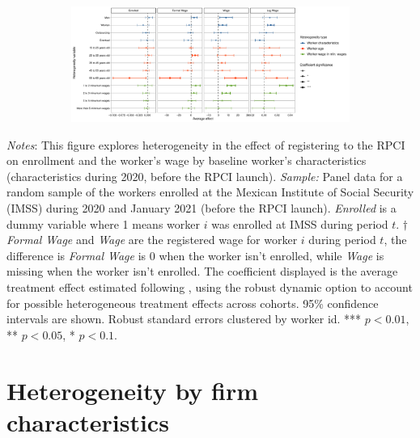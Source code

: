 \documentclass[10pt, oneside]{book}
\begin{document}
\begin{figure}[H]
    \centering
    \caption{Heterogeneity by worker characteristics \label{fig:heterogeneity_worker_rpci}}
    
    \begin{subfigure}{\textwidth}
    \includegraphics[width=\textwidth]{04_Figures/muestra_10porciento/dcdh_heterogeneity_worker_characteristics.pdf}
    \end{subfigure}
    
\end{figure}

\scriptsize{
\noindent \textit{Notes}: This figure explores heterogeneity in the effect of registering to the RPCI on enrollment and the worker's wage by baseline worker's characteristics (characteristics during 2020, before the RPCI launch). \textit{Sample:} Panel data for a random sample of the workers enrolled at the Mexican Institute of Social Security (IMSS) during 2020 and January 2021 (before the RPCI launch). \textit{Enrolled} is a dummy variable where 1 means worker $i$ was enrolled at IMSS during period $t$. $\dagger$ \textit{Formal Wage} and \textit{Wage} are the registered wage for worker $i$ during period $t$, the difference is \textit{Formal Wage} is 0 when the worker isn't enrolled, while \textit{Wage} is missing when the worker isn't enrolled. The coefficient displayed is the average treatment effect estimated following \cite{de2020two}, using the robust dynamic option to account for possible heterogeneous treatment effects across cohorts. 95\% confidence intervals are shown. Robust standard errors clustered by worker id. *** $p<0.01$, ** $p<0.05$, * $p<0.1$. %
} \\

\normalsize

\section{Heterogeneity by firm characteristics}
\end{document}
